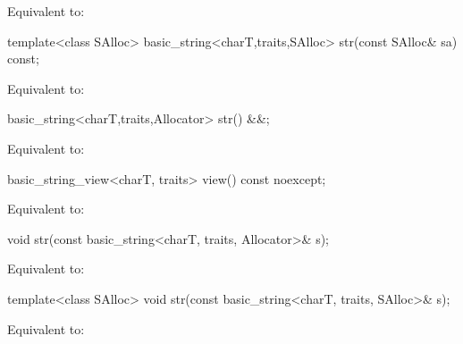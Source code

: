 \begin{itemdescr}
\pnum
\effects
Equivalent to: 
\end{itemdescr}

%
\begin{itemdecl}
template<class SAlloc>
  basic_string<charT,traits,SAlloc> str(const SAlloc& sa) const;
\end{itemdecl}

\begin{itemdescr}
\pnum
\effects
Equivalent to: 
\end{itemdescr}

%
\begin{itemdecl}
basic_string<charT,traits,Allocator> str() &&;
\end{itemdecl}

\begin{itemdescr}
\pnum
\effects
Equivalent to: 
\end{itemdescr}

%
\begin{itemdecl}
basic_string_view<charT, traits> view() const noexcept;
\end{itemdecl}

\begin{itemdescr}
\pnum
\effects
Equivalent to: 
\end{itemdescr}

%
\begin{itemdecl}
void str(const basic_string<charT, traits, Allocator>& s);
\end{itemdecl}

\begin{itemdescr}
\pnum
\effects
Equivalent to: 
\end{itemdescr}

%
\begin{itemdecl}
template<class SAlloc>
  void str(const basic_string<charT, traits, SAlloc>& s);
\end{itemdecl}

\begin{itemdescr}
\pnum
\effects
Equivalent to: 
\end{itemdescr}

